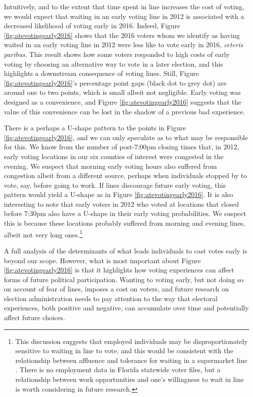 \documentclass[12pt,titlepage]{article}
\begin{document}
Intuitively, and to the extent that time spent in line increases the
cost of voting, we would expect that waiting in an early voting line
in 2012 is associated with a decreased likelihood of voting early in
2016.  Indeed, Figure \ref{fig:atevotingearly2016} shows that the 2016
voters whom we identify as having waited in an early voting line in
2012 were less like to vote early in 2016, \emph{ceteris paribus}.
This result shows how some voters responded to high costs of early
voting by choosing an alternative way to vote in a later election, and
this highlights a downstream consequence of voting lines.  Still,
Figure \ref{fig:atevotingearly2016}'s percentage point gaps (black dot
to grey dot) are around one to two points, which is small albeit not
negligible.  Early voting was designed as a convenience, and Figure
\ref{fig:atevotingearly2016} suggests that the value of this
convenience can be lost in the shadow of a previous bad experience.

There is a perhaps a U-shape pattern to the points in Figure
\ref{fig:atevotingearly2016}, and we can only speculate as to what may
be responsible for this. We know from the number of post-7:00pm
closing times that, in 2012, early voting locations in our six
counties of interest were congested in the evening. We suspect that
morning early voting hours also suffered from congestion albeit from a
different source, perhaps when individuals stopped by to vote, say,
before going to work. If lines discourage future early voting, this
pattern would yield a U-shape as in Figure
\ref{fig:atevotingearly2016}. It is also interesting to note that
early voters in 2012 who voted at locations that closed before 7:30pm
also have a U-shape in their early voting probabilities. We suspect
this is because these locations probably suffered from morning and
evening lines, albeit not very long ones.\footnote{This discussion
  suggests that employed individuals may be disproportionately
  sensitive to waiting in line to vote, and this would be consistent
  with the relationship between affluence and tolerance for waiting in
  a supermarket line \citep[e.g.,][]{bennett:waitinginlinechars}.
  There is no employment data in Florida statewide voter files, but a
  relationship between work opportunities and one's willingness to
  wait in line is worth considering in future research.}

A full analysis of the determinants of what leads individuals to cast
votes early is beyond our scope.  However, what is most important
about Figure \ref{fig:atevotingearly2016} is that it highlights how
voting experiences can affect forms of future political participation.
Wanting to voting early, but not doing so on account of fear of lines,
imposes a cost on voters, and future research on election
administration needs to pay attention to the way that electoral
experiences, both positive and negative, can accumulate over time and
potentially affect future choices.
\end{document}
